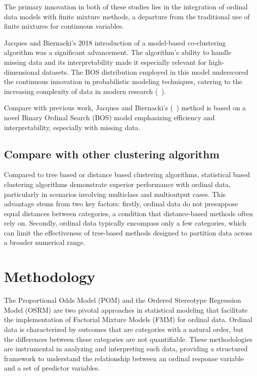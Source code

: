 \documentclass{article}
\begin{document}
The primary innovation in both of these studies lies in the integration of ordinal data models with finite mixture methods, a departure from the traditional use of finite mixtures for continuous variables.


Jacques and Biernacki's 2018 introduction of a model-based co-clustering algorithm was a significant advancement. The algorithm's ability to handle missing data and its interpretability made it especially relevant for high-dimensional datasets. The BOS distribution employed in this model underscored the continuous innovation in probabilistic modeling techniques, catering to the increasing complexity of data in modern research (~\cite{jacques2018model}).

Compare with previous work, Jacques and Biernacki's (~\cite{jacques2018model}) method is based on a novel Binary Ordinal Search (BOS) model emphasizing efficiency and interpretability, especially with missing data. 

\subsection*{Compare with other clustering algorithm}

Compared to tree based or distance based clustering algorithms, statistical based clustering algorithms demonstrate superior performance with ordinal data, particularly in scenarios involving multiclass and multioutput cases. 
This advantage stems from two key factors: firstly, ordinal data do not presuppose equal distances between categories, a condition that distance-based methods often rely on. Secondly, ordinal data typically encompass only a few categories, which can limit the effectiveness of tree-based methods designed to partition data across a broader numerical range.


\section{Methodology}

The Proportional Odds Model (POM) and the Ordered Stereotype Regression Model (OSRM) are two pivotal approaches in statistical modeling that facilitate the implementation of Factorial Mixture Models (FMM) for ordinal data. Ordinal data is characterized by outcomes that are categories with a natural order, but the differences between these categories are not quantifiable. These methodologies are instrumental in analyzing and interpreting such data, providing a structured framework to understand the relationship between an ordinal response variable and a set of predictor variables.
\end{document}
